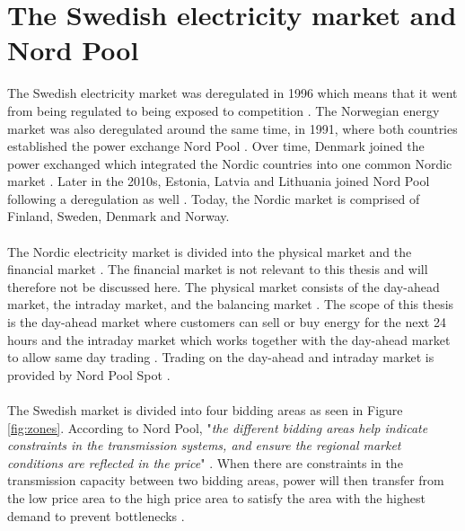 \section{The Swedish electricity market and Nord Pool}\label{market}
The Swedish electricity market was deregulated in 1996 which means that it went from being regulated to being exposed to competition \cite{history1}. The Norwegian energy market was also deregulated around the same time, in 1991, where both countries established the power exchange Nord Pool \cite{history2}. Over time, Denmark joined the power exchanged which integrated the Nordic countries into one common Nordic market \cite{history2}. Later in the 2010s, Estonia, Latvia and Lithuania joined Nord Pool following a deregulation as well \cite{history3}. Today, the Nordic market is comprised of Finland, Sweden, Denmark and Norway\cite{history2}. 
\\\\
The Nordic electricity market is divided into the physical market and the financial market \cite{NEM}. The financial market is not relevant to this thesis and will therefore not be discussed here. The physical market consists of the day-ahead market, the intraday market, and the balancing market \cite{NEM}. The scope of this thesis is the day-ahead market where customers can sell or buy energy for the next 24 hours \cite{NordPool} and the intraday market which works together with the day-ahead market to allow same day trading \cite{NordPool_intraday}. Trading on the day-ahead and intraday market is provided by Nord Pool Spot \cite{NEM}. 
\\\\
The Swedish market is divided into four bidding areas as seen in Figure \ref{fig:zones}.
According to Nord Pool, "\textit{the different bidding areas help indicate constraints in the transmission systems, and ensure the regional market conditions are reflected in the price}" \cite{areas}. When there are constraints in the transmission capacity between two bidding areas, power will then transfer from the low price area to the high price area to satisfy the area with the highest demand to prevent bottlenecks \cite{areas}. 

